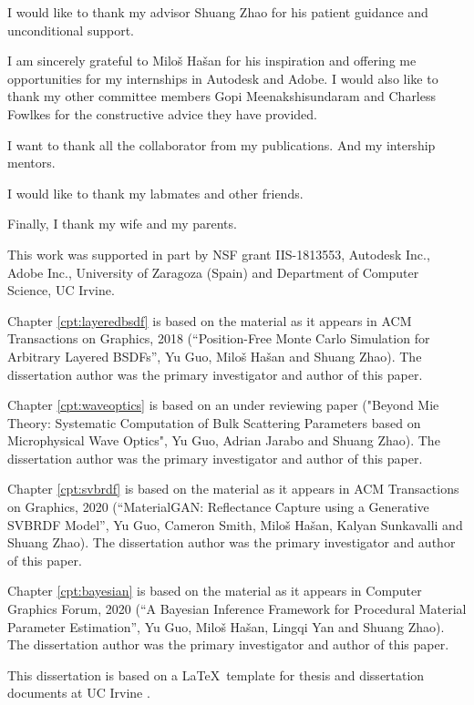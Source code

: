 \acknowledgments
{
  I would like to thank my advisor Shuang Zhao for his patient guidance and unconditional support.
  
  I am sincerely grateful to Milo\v{s} Ha\v{s}an for his inspiration and offering me opportunities for my internships in Autodesk and Adobe. I would also like to thank my other committee members Gopi Meenakshisundaram and Charless Fowlkes for the constructive advice they have provided. 
  
  I want to thank all the collaborator from my publications.
  And my intership mentors.
  
  I would like to thank my labmates and other friends.
  
  Finally, I thank my wife and my parents.
  
  This work was supported in part by NSF grant IIS-1813553, Autodesk Inc., Adobe Inc., University of Zaragoza (Spain) and Department of Computer Science, UC Irvine.
  
  Chapter \ref{cpt:layeredbsdf} is based on the material as it appears in ACM Transactions on Graphics, 2018
  (“Position-Free Monte Carlo Simulation for Arbitrary Layered BSDFs”, Yu Guo, Milo\v{s} Ha\v{s}an and Shuang Zhao). The dissertation author was the primary investigator and author of this paper.
  
  Chapter \ref{cpt:waveoptics} is based on an under reviewing paper
  ("Beyond Mie Theory: Systematic Computation of Bulk Scattering Parameters based on Microphysical Wave Optics", Yu Guo, Adrian Jarabo and Shuang Zhao). The dissertation author was the primary investigator and author of this paper.
  
  Chapter \ref{cpt:svbrdf} is based on the material as it appears in ACM Transactions on Graphics, 2020
  (“MaterialGAN: Reflectance Capture using a Generative SVBRDF Model”, Yu Guo, Cameron Smith, Milo\v{s} Ha\v{s}an, Kalyan Sunkavalli and Shuang Zhao). The dissertation author was the primary investigator and author of this paper.
  
  Chapter \ref{cpt:bayesian} is based on the material as it appears in Computer Graphics Forum, 2020
  (“A Bayesian Inference Framework for Procedural Material Parameter Estimation”, Yu Guo, Milo\v{s} Ha\v{s}an, Lingqi Yan and Shuang Zhao). The dissertation author was the primary investigator and author of this paper.

  This dissertation is based on a \LaTeX~template for thesis and dissertation documents at UC Irvine \cite{uci-thesis-latex}.
}


